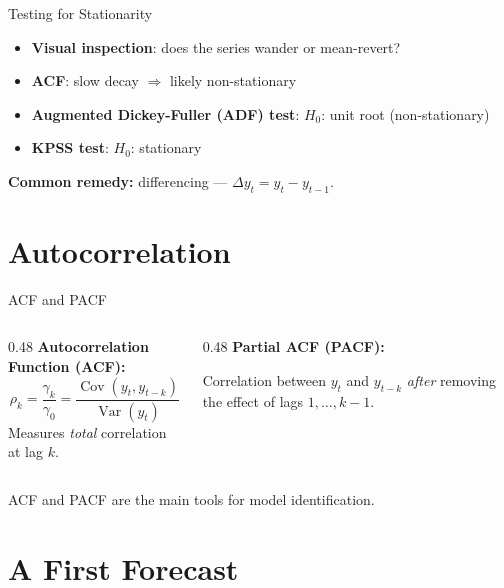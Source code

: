 \documentclass[aspectratio=169, 10pt]{beamer}
\begin{document}
\begin{frame}{Testing for Stationarity}
\begin{itemize}
    \item \textbf{Visual inspection}: does the series wander or mean-revert?
    \item \textbf{ACF}: slow decay $\Rightarrow$ likely non-stationary
    \item \textbf{Augmented Dickey-Fuller (ADF) test}: $H_0$: unit root (non-stationary)
    \item \textbf{KPSS test}: $H_0$: stationary
\end{itemize}

\vspace{0.5em}
\textbf{Common remedy:} differencing --- $\Delta y_t = y_t - y_{t-1}$.
\end{frame}

\section{Autocorrelation}

\begin{frame}{ACF and PACF}
\begin{columns}[T]
\begin{column}{0.48\textwidth}
\textbf{Autocorrelation Function (ACF):}
\[
\rho_k = \frac{\gamma_k}{\gamma_0} = \frac{\operatorname{Cov}(y_t, y_{t-k})}{\operatorname{Var}(y_t)}
\]
Measures \emph{total} correlation at lag $k$.
\end{column}
\begin{column}{0.48\textwidth}
\textbf{Partial ACF (PACF):}

Correlation between $y_t$ and $y_{t-k}$ \emph{after} removing the effect of lags $1, \ldots, k-1$.
\end{column}
\end{columns}

\vspace{0.5em}
ACF and PACF are the main tools for \alert{model identification}.
\end{frame}

\section{A First Forecast}
\end{document}
